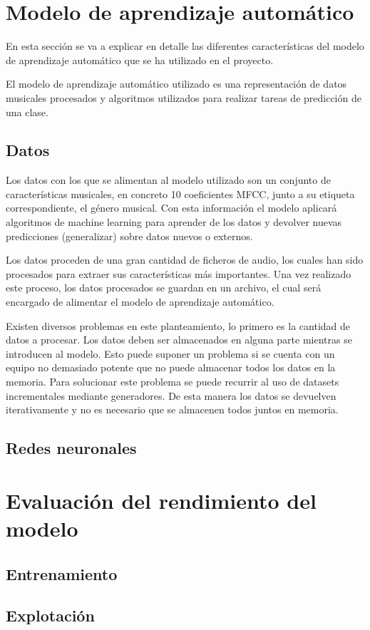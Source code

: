 \newpage

\section{Modelo de aprendizaje automático}

En esta sección se va a explicar en detalle las diferentes características del modelo de aprendizaje automático que se ha utilizado en el proyecto.

El modelo de aprendizaje automático utilizado es una representación de datos musicales procesados y algoritmos utilizados para realizar tareas de predicción de una clase.

\subsection{Datos}

Los datos con los que se alimentan al modelo utilizado son un conjunto de características musicales, en concreto 10 coeficientes MFCC, junto a su etiqueta correspondiente, el género musical. Con esta información el modelo aplicará algoritmos de machine learning para aprender de los datos y devolver nuevas predicciones
(generalizar) sobre datos nuevos o externos.

Los datos proceden de una gran cantidad de ficheros de audio, los cuales han sido procesados para extraer sus características más importantes. Una vez realizado este proceso, los datos procesados se guardan en un archivo, el cual será encargado de alimentar el modelo de aprendizaje automático.

Existen diversos problemas en este planteamiento, lo primero es la cantidad de datos a procesar. Los datos deben ser almacenados en alguna parte mientras se introducen al modelo. Esto puede suponer un problema si se cuenta con un equipo no demasiado potente que no puede almacenar todos los datos en la memoria.
Para solucionar este problema se puede recurrir al uso de datasets incrementales mediante generadores. De esta manera los datos se devuelven iterativamente y no es necesario que se almacenen todos juntos en memoria.

\subsection{Redes neuronales}

\section{Evaluación del rendimiento del modelo}

\subsection{Entrenamiento}

\subsection{Explotación}